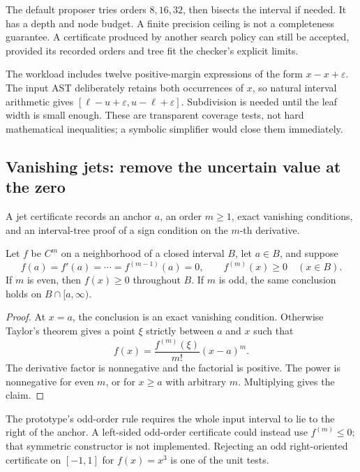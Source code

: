 The default proposer tries orders \(8,16,32\), then bisects the interval if needed. It has a depth and node budget. A finite precision ceiling is not a completeness guarantee. A certificate produced by another search policy can still be accepted, provided its recorded orders and tree fit the checker's explicit limits.

The workload includes twelve positive-margin expressions of the form \(x-x+\varepsilon\). The input AST deliberately retains both occurrences of \(x\), so natural interval arithmetic gives \([\ell-u+\varepsilon,u-\ell+\varepsilon]\). Subdivision is needed until the leaf width is small enough. These are transparent coverage tests, not hard mathematical inequalities; a symbolic simplifier would close them immediately.

\subsection{Vanishing jets: remove the uncertain value at the zero}
A jet certificate records an anchor \(a\), an order \(m\ge1\), exact vanishing conditions, and an interval-tree proof of a sign condition on the \(m\)-th derivative.

\begin{theorem}\label{thm:jet}
Let \(f\) be \(C^m\) on a neighborhood of a closed interval \(B\), let \(a\in B\), and suppose
\begin{equation}\label{eq:vanishing}
 f(a)=f'(a)=\cdots=f^{(m-1)}(a)=0,
 \qquad f^{(m)}(x)\ge0\quad(x\in B).
\end{equation}
If \(m\) is even, then \(f(x)\ge0\) throughout \(B\). If \(m\) is odd, the same conclusion holds on \(B\cap[a,\infty)\).
\end{theorem}
\begin{proof}
At \(x=a\), the conclusion is an exact vanishing condition. Otherwise Taylor's theorem gives a point \(\xi\) strictly between \(a\) and \(x\) such that
\[
 f(x)=\frac{f^{(m)}(\xi)}{m!}(x-a)^m.
\]
The derivative factor is nonnegative and the factorial is positive. The power is nonnegative for even \(m\), or for \(x\ge a\) with arbitrary \(m\). Multiplying gives the claim.
\end{proof}

The prototype's odd-order rule requires the whole input interval to lie to the right of the anchor. A left-sided odd-order certificate could instead use \(f^{(m)}\le0\); that symmetric constructor is not implemented. Rejecting an odd right-oriented certificate on \([-1,1]\) for \(f(x)=x^3\) is one of the unit tests.

